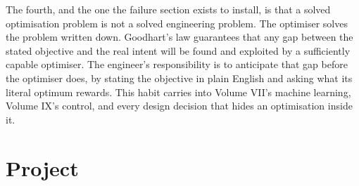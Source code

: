 The fourth, and the one the failure section exists to install, is
that a solved optimisation problem is not a solved engineering
problem. The optimiser solves the problem written down. Goodhart's
law guarantees that any gap between the stated objective and the
real intent will be found and exploited by a sufficiently capable
optimiser. The engineer's responsibility is to anticipate that gap
before the optimiser does, by stating the objective in plain
English and asking what its literal optimum rewards. This habit
carries into Volume VII's machine learning, Volume IX's control,
and every design decision that hides an optimisation inside it.

\section{Project}

